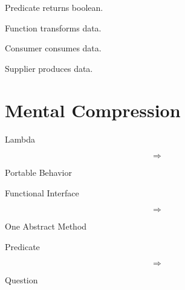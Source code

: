 \documentclass[11pt,a4paper]{book}
\begin{document}

\begin{rosettarule}

Predicate returns boolean.

\end{rosettarule}


\begin{rosettarule}

Function transforms data.

\end{rosettarule}


\begin{rosettarule}

Consumer consumes data.

\end{rosettarule}


\begin{rosettarule}

Supplier produces data.

\end{rosettarule}


\section{Mental Compression}

Lambda

\[
\Rightarrow
\]

Portable Behavior


Functional Interface

\[
\Rightarrow
\]

One Abstract Method


Predicate

\[
\Rightarrow
\]

Question

\end{document}
